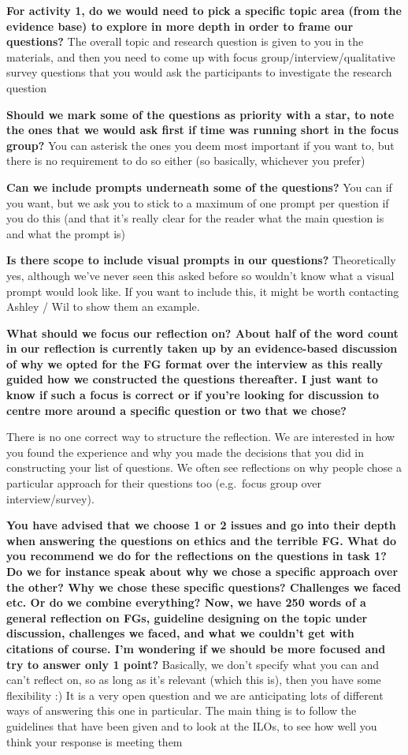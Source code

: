 \documentclass[
  english,
  letterpaper,
  DIV=11,
  numbers=noendperiod]{scrreprt}
\begin{document}
\textbf{For activity 1, do we would need to pick a specific topic area
(from the evidence base) to explore in more depth in order to frame our
questions?} The overall topic and research question is given to you in
the materials, and then you need to come up with focus
group/interview/qualitative survey questions that you would ask the
participants to investigate the research question

\textbf{Should we mark some of the questions as priority with a star, to
note the ones that we would ask first if time was running short in the
focus group?} You can asterisk the ones you deem most important if you
want to, but there is no requirement to do so either (so basically,
whichever you prefer)

\textbf{Can we include prompts underneath some of the questions?} You
can if you want, but we ask you to stick to a maximum of one prompt per
question if you do this (and that it's really clear for the reader what
the main question is and what the prompt is)

\textbf{Is there scope to include visual prompts in our questions?}
Theoretically yes, although we've never seen this asked before so
wouldn't know what a visual prompt would look like. If you want to
include this, it might be worth contacting Ashley / Wil to show them an
example.

\textbf{What should we focus our reflection on? About half of the word
count in our reflection is currently taken up by an evidence-based
discussion of why we opted for the FG format over the interview as this
really guided how we constructed the questions thereafter. I just want
to know if such a focus is correct or if you're looking for discussion
to centre more around a specific question or two that we chose?}

There is no one correct way to structure the reflection. We are
interested in how you found the experience and why you made the
decisions that you did in constructing your list of questions. We often
see reflections on why people chose a particular approach for their
questions too (e.g.~focus group over interview/survey).

\textbf{You have advised that we choose 1 or 2 issues and go into their
depth when answering the questions on ethics and the terrible FG. What
do you recommend we do for the reflections on the questions in task 1?
Do we for instance speak about why we chose a specific approach over the
other? Why we chose these specific questions? Challenges we faced etc.
Or do we combine everything? Now, we have 250 words of a general
reflection on FGs, guideline designing on the topic under discussion,
challenges we faced, and what we couldn't get with citations of course.
I'm wondering if we should be more focused and try to answer only 1
point?} Basically, we don't specify what you can and can't reflect on,
so as long as it's relevant (which this is), then you have some
flexibility :) It is a very open question and we are anticipating lots
of different ways of answering this one in particular. The main thing is
to follow the guidelines that have been given and to look at the ILOs,
to see how well you think your response is meeting them
\end{document}
